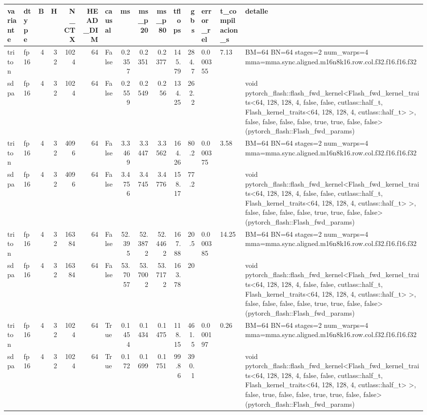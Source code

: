 \begin{table}[htbp]
  \centering\small
  \begin{tabular}{llrrrrlrrrrrlll}
    \toprule
    variante & dtype & B & H & N\_CTX & HEAD\_DIM & causal & ms & ms\_p20 & ms\_p80 & tflops & gbs & error\_rel & t\_compilacion\_s & detalle \\
    \midrule
    triton & fp16 & 4 & 32 & 1024 & 64 & False & 0.2357 & 0.2351 & 0.2377 & 145.79 & 284.7 & 0.000355 & 7.13 & BM=64 BN=64 stages=2 num\_warps=4 mma=mma.sync.aligned.m16n8k16.row.col.f32.f16.f16.f32 \\
    sdpa & fp16 & 4 & 32 & 1024 & 64 & False & 0.2559 & 0.2549 & 0.256 & 134.25 & 262.2 &  &  & void pytorch\_flash::flash\_fwd\_kernel<Flash\_fwd\_kernel\_traits<64, 128, 128, 4, false, false, cutlass::half\_t, Flash\_kernel\_traits<64, 128, 128, 4, cutlass::half\_t> >, false, false, false, false, true, true, false, false>(pytorch\_flash::Flash\_fwd\_params) \\
    triton & fp16 & 4 & 32 & 4096 & 64 & False & 3.3469 & 3.3447 & 3.3562 & 164.26 & 80.2 & 0.000375 & 3.58 & BM=64 BN=64 stages=2 num\_warps=4 mma=mma.sync.aligned.m16n8k16.row.col.f32.f16.f16.f32 \\
    sdpa & fp16 & 4 & 32 & 4096 & 64 & False & 3.4756 & 3.4745 & 3.4776 & 158.17 & 77.2 &  &  & void pytorch\_flash::flash\_fwd\_kernel<Flash\_fwd\_kernel\_traits<64, 128, 128, 4, false, false, cutlass::half\_t, Flash\_kernel\_traits<64, 128, 128, 4, cutlass::half\_t> >, false, false, false, false, true, true, false, false>(pytorch\_flash::Flash\_fwd\_params) \\
    triton & fp16 & 4 & 32 & 16384 & 64 & False & 52.395 & 52.3872 & 52.4462 & 167.88 & 20.5 & 0.000385 & 14.25 & BM=64 BN=64 stages=2 num\_warps=4 mma=mma.sync.aligned.m16n8k16.row.col.f32.f16.f16.f32 \\
    sdpa & fp16 & 4 & 32 & 16384 & 64 & False & 53.7057 & 53.7002 & 53.7172 & 163.78 & 20 &  &  & void pytorch\_flash::flash\_fwd\_kernel<Flash\_fwd\_kernel\_traits<64, 128, 128, 4, false, false, cutlass::half\_t, Flash\_kernel\_traits<64, 128, 128, 4, cutlass::half\_t> >, false, false, false, false, true, true, false, false>(pytorch\_flash::Flash\_fwd\_params) \\
    triton & fp16 & 4 & 32 & 1024 & 64 & True & 0.1454 & 0.1434 & 0.1475 & 118.15 & 461.5 & 0.000197 & 0.26 & BM=64 BN=64 stages=2 num\_warps=4 mma=mma.sync.aligned.m16n8k16.row.col.f32.f16.f16.f32 \\
    sdpa & fp16 & 4 & 32 & 1024 & 64 & True & 0.172 & 0.1699 & 0.1751 & 99.86 & 390.1 &  &  & void pytorch\_flash::flash\_fwd\_kernel<Flash\_fwd\_kernel\_traits<64, 128, 128, 4, false, false, cutlass::half\_t, Flash\_kernel\_traits<64, 128, 128, 4, cutlass::half\_t> >, false, true, false, false, true, true, false, false>(pytorch\_flash::Flash\_fwd\_params) \\

\end{tabular}
\end{table}
